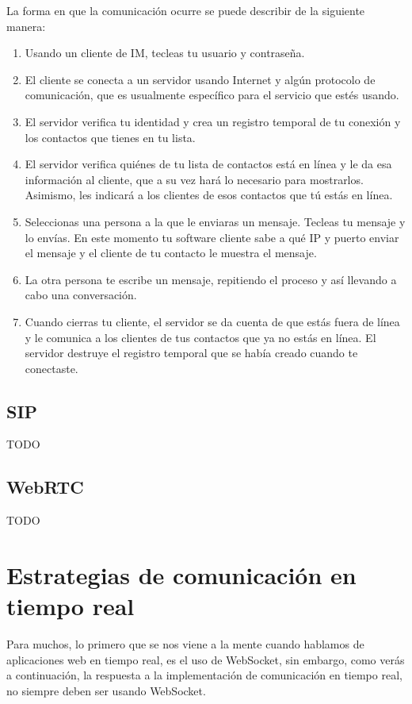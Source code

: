 La forma en que la comunicación ocurre se puede describir de la siguiente manera:

\begin{enumerate}
  \item Usando un cliente de IM, tecleas tu usuario y contraseña.
  \item El cliente se conecta a un servidor usando Internet y algún protocolo de comunicación, que es usualmente específico para el servicio que estés usando.
  \item El servidor verifica tu identidad y crea un registro temporal de tu conexión y los contactos que tienes en tu lista.
  \item El servidor verifica quiénes de tu lista de contactos está en línea y le da esa información al cliente, que a su vez hará lo necesario para mostrarlos. Asimismo, les indicará a los clientes de esos contactos que tú estás en línea.
  \item Seleccionas una persona a la que le enviaras un mensaje. Tecleas tu mensaje y lo envías. En este momento tu software cliente sabe a qué IP y puerto enviar el mensaje y el cliente de tu contacto le muestra el mensaje.
  \item La otra persona te escribe un mensaje, repitiendo el proceso y así llevando a cabo una conversación.
  \item Cuando cierras tu cliente, el servidor se da cuenta de que estás fuera de línea y le comunica a los clientes de tus contactos que ya no estás en línea. El servidor destruye el registro temporal que se había creado cuando te conectaste.
\end{enumerate}

\subsection{SIP}

TODO

\subsection{WebRTC}

TODO

\section{Estrategias de comunicación en tiempo real}

Para muchos, lo primero que se nos viene a la mente cuando hablamos de aplicaciones web en tiempo real, es el uso de WebSocket, sin embargo, como verás a continuación, la respuesta a la implementación de comunicación en tiempo real, no siempre deben ser usando WebSocket.

